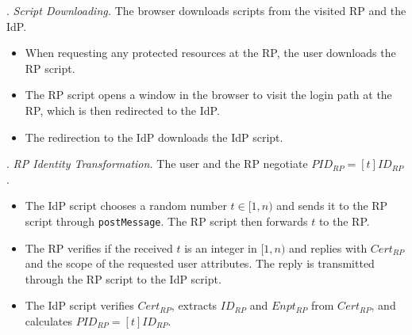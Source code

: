 \vspace{0.85mm}
. {\em Script Downloading.}
The browser downloads scripts from the visited RP and the IdP.
\vspace{-\topsep}
\begin{itemize}
\setlength{\topsep}{0pt}
\setlength{\partopsep}{0pt}
\setlength{\itemsep}{0pt}
\setlength{\parsep}{0pt}
\setlength{\parskip}{0pt}
\item[1.1]
When requesting any protected resources at the RP, the user downloads the RP script.
\item[1.2]
The RP script opens a window in the browser to visit the login path at the RP, which is then redirected to the IdP.
\item[1.3]
The redirection to the IdP downloads the IdP script.
\end{itemize}



. {\em RP Identity Transformation.}
The user and the RP negotiate $PID_{RP} = [t]{ID_{RP}}$.
\vspace{-\topsep}
\begin{itemize}
\setlength{\topsep}{0pt}
\setlength{\partopsep}{0pt}
\setlength{\itemsep}{0pt}
\setlength{\parsep}{0pt}
\setlength{\parskip}{0pt}
\item[2.1] The IdP script chooses a random number $t \in [1, n)$ and sends it to the RP script through \verb+postMessage+. The RP script then forwards $t$ to the RP.
\item[2.2] The RP verifies if the received $t$ is an integer in $[1, n)$ and
replies with $Cert_{RP}$ and the scope of the requested user attributes. The reply is transmitted through the RP script to the IdP script.  %
\item[2.3] The IdP script verifies $Cert_{RP}$, extracts $ID_{RP}$ and $Enpt_{RP}$ from $Cert_{RP}$, and calculates $PID_{RP}=[t]{ID_{RP}}$.

\end{itemize}


